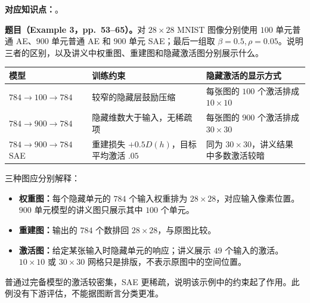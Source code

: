 
\textbf{对应知识点：}。

\textbf{题目（Example 3，pp.~53--65）。}对 $28\times28$ MNIST 图像分别使用 $100$ 单元普通 AE、$900$ 单元普通 AE 和 $900$ 单元 SAE；最后一组取 $\beta=0.5,\rho=0.05$。说明三者的区别，以及讲义中权重图、重建图和隐藏激活图分别展示什么。

\begin{workedsolution}
\begin{center}
\small
\begin{tabularx}{\textwidth}{@{}lXX@{}}
\toprule
模型 & 训练约束 & 隐藏激活的显示方式 \\
\midrule
$784\to100\to784$ & 较窄的隐藏层鼓励压缩 & 每张图的 $100$ 个激活排成 $10\times10$ \\
$784\to900\to784$ & 隐藏维数大于输入，无稀疏项 & 每张图的 $900$ 个激活排成 $30\times30$ \\
$784\to900\to784$ SAE & 重建损失 $+0.5D(h)$，目标平均激活 $.05$ & 同为 $30\times30$，讲义结果中多数激活较暗 \\
\bottomrule
\end{tabularx}
\end{center}
三种图应分别解释：
\begin{itemize}
 \item \textbf{权重图：}每个隐藏单元的 $784$ 个输入权重排为 $28\times28$，对应输入像素位置。$900$ 单元模型的讲义图只展示其中 $100$ 个单元。
 \item \textbf{重建图：}输出的 $784$ 个数排回 $28\times28$，与原图比较。
 \item \textbf{激活图：}给定某张输入时隐藏单元的响应；讲义展示 $49$ 个输入的激活。$10\times10$ 或 $30\times30$ 网格只是排版，不表示原图中的空间位置。
\end{itemize}
普通过完备模型的激活较密集，SAE 更稀疏，说明该示例中的约束起了作用。此例没有下游评估，不能据图断言分类更准。
\end{workedsolution}
